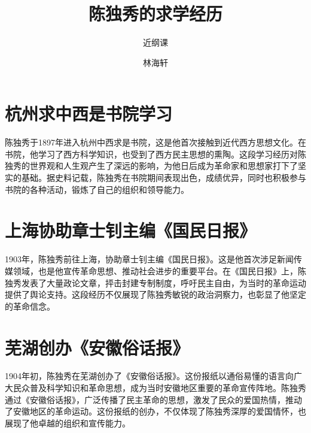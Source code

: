 \documentclass[10pt,a4paper]{beamer} %
\begin{document}
	
	\title{陈独秀的求学经历}
	\subtitle{近纲课}
	\author{林海轩}
	\date{}
	
	\begin{frame}
		\titlepage
	\end{frame}
	
	\begin{frame}
		\tableofcontents
	\end{frame}
	
	
	\section{杭州求中西是书院学习}
	\begin{frame}
		陈独秀于1897年进入杭州中西求是书院，这是他首次接触到近代西方思想文化。在书院，他学习了西方科学知识，也受到了西方民主思想的熏陶。这段学习经历对陈独秀的世界观和人生观产生了深远的影响，为他日后成为革命家和思想家打下了坚实的基础。据史料记载，陈独秀在书院期间表现出色，成绩优异，同时也积极参与书院的各种活动，锻炼了自己的组织和领导能力。
	\end{frame}
	
	\section{上海协助章士钊主编《国民日报》}
	\begin{frame}
		1903年，陈独秀前往上海，协助章士钊主编《国民日报》。这是他首次涉足新闻传媒领域，也是他宣传革命思想、推动社会进步的重要平台。在《国民日报》上，陈独秀发表了大量政论文章，抨击封建专制制度，呼吁民主自由，为当时的革命运动提供了舆论支持。这段经历不仅展现了陈独秀敏锐的政治洞察力，也彰显了他坚定的革命信念。
	\end{frame}
	
	\section{芜湖创办《安徽俗话报》}
	\begin{frame}
		1904年初，陈独秀在芜湖创办了《安徽俗话报》。这份报纸以通俗易懂的语言向广大民众普及科学知识和革命思想，成为当时安徽地区重要的革命宣传阵地。陈独秀通过《安徽俗话报》，广泛传播了民主革命的思想，激发了民众的爱国热情，推动了安徽地区的革命运动。这份报纸的创办，不仅体现了陈独秀深厚的爱国情怀，也展现了他卓越的组织和宣传能力。
	\end{frame}
	
\end{document}
